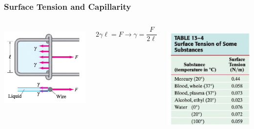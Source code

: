\documentclass[]{beamer}
\begin{document}
\begin{frame}

\frametitle{Surface Tension and Capillarity}






   \begin{columns}[c]
   \column{2in}  %

    \begin{center}
  \includegraphics[height=1.7in]{images2/surfacet9.jpg}
\end{center}

\begin{equation*}
2 \gamma \ell=F \rightarrow \gamma=\boxed{\frac{F}{2\ell}}
\end{equation*}

   \column{2in}







    \begin{center}
  \includegraphics[height=2.2in]{images2/surfacet_table.jpg}
\end{center}

   \end{columns}



 \end{frame}

\end{document}

